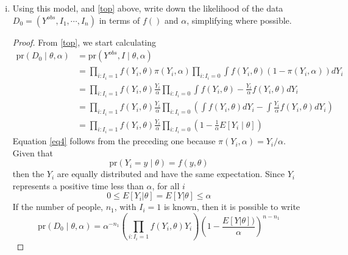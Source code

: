 \documentclass[letterpaper, 12pt]{article}
\newcommand{\pr}{\text{pr}}
\newcommand{\sbs}{\;|\;} %
\begin{document}
\begin{enumerate}[(i)]
\item
Using this model, and \eqref{top} above, write down the likelihood of the data $D_0 = (Y^{obs}, I_1, \cdots, I_n)$ in terms of $f()$ and $\alpha$, simplifying where possible.

\begin{proof}
From \eqref{top}, we start calculating
\begin{align}
\pr(D_0 \sbs \theta, \alpha) &= \pr(Y^{obs}, I \;|\; \theta, \alpha) \\
&= \prod_{i:I_i = 1} f(Y_i,\theta) \pi (Y_i, \alpha)
\prod_{i:I_i = 0} \int f(Y_i, \theta)(1 - \pi (Y_i,\alpha))dY_i \\
&= \prod_{i:I_i = 1} f(Y_i,\theta) \frac{Y_i}{ \alpha}
\prod_{i:I_i = 0} \int f(Y_i, \theta) - \frac{Y_i}{\alpha} f(Y_i, \theta) dY_i \label{eq4}\\
&= \prod_{i:I_i = 1} f(Y_i,\theta) \frac{Y_i}{ \alpha}
\prod_{i:I_i = 0} \left(\int f(Y_i, \theta) dY_i - \int \frac{Y_i}{\alpha} f(Y_i, \theta) dY_i \right) \\
&= \prod_{i:I_i = 1} f(Y_i,\theta) \frac{Y_i}{ \alpha}
\prod_{i:I_i = 0} \left(1 - \frac{1}{\alpha} E[Y_i\;|\;\theta] \right) 
\label{eq6}
\end{align}
Equation \eqref{eq4} follows from the preceding one because $\pi(Y_i, \alpha) = Y_i / \alpha$.
Given that
\begin{equation}
\pr(Y_i = y \;|\; \theta) = f(y, \theta)
\end{equation}
then the $Y_i$ are equally distributed and have the same expectation. Since $Y_i$ represents a positive time less than $\alpha$, for all $i$
\begin{equation}
0 \leq E[Y_i | \theta] = E[Y | \theta] \leq \alpha
\end{equation}
If the number of people, $n_1$, with $I_i = 1$ is known, then
it is possible to write
\begin{equation}
\pr(D_0 \sbs \theta, \alpha)
=
\alpha^{-n_1}\left(\prod_{i:I_i = 1} f(Y_i,\theta) Y_i\right)
\left(1 - \frac{E[Y | \theta])}{\alpha} \right)^{n - n_1} \label{eq7}
\end{equation}

\end{proof}


\end{enumerate}
\end{document}
